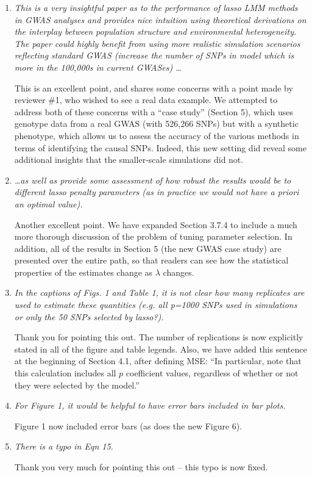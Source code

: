 \documentclass{article}
\begin{document}
\begin{enumerate}

\item \emph{This is a very insightful paper as to the performance of lasso LMM methods in GWAS analyses and provides nice intuition using theoretical derivations on the interplay between population structure and environmental heterogeneity. The paper could highly benefit from using more realistic simulation scenarios reflecting standard GWAS (increase the number of SNPs in model which is more in the 100,000s in current GWASes) \ldots}

  This is an excellent point, and shares some concerns with a point made by reviewer \#1, who wished to see a real data example.  We attempted to address both of these concerns with a ``case study'' (Section 5), which uses genotype data from a real GWAS (with 526,266 SNPs) but with a synthetic phenotype, which allows us to assess the accuracy of the various methods in terms of identifying the causal SNPs.  Indeed, this new setting did reveal some additional insights that the smaller-scale simulations did not.

  \item \emph{\ldots as well as provide some assessment of how robust the results would be to different lasso penalty parameters (as in practice we would not have a priori an optimal value).}

  Another excellent point.  We have expanded Section 3.7.4 to include a much more thorough discussion of the problem of tuning parameter selection.  In addition, all of the results in Section 5 (the new GWAS case study) are presented over the entire path, so that readers can see how the statistical properties of the estimates change as $\lambda$ changes.

\item \emph{In the captions of Figs. 1 and Table 1, it is not clear how many replicates are used to estimate these quantities (e.g. all p=1000 SNPs used in simulations or only the 50 SNPs selected by lasso?).}

  Thank you for pointing this out.  The number of replications is now explicitly stated in all of the figure and table legends.  Also, we have added this sentence at the beginning of Section 4.1, after defining MSE: ``In particular, note that this calculation includes all $p$ coefficient values, regardless of whether or not they were selected by the model.''

\item \emph{For Figure 1, it would be helpful to have error bars included in bar plots.}

  Figure 1 now included error bars (as does the new Figure 6).

\item \emph{There is a typo in Eqn 15.}

  Thank you very much for pointing this out -- this typo is now fixed.

\end{enumerate}

%
%
\end{document}
